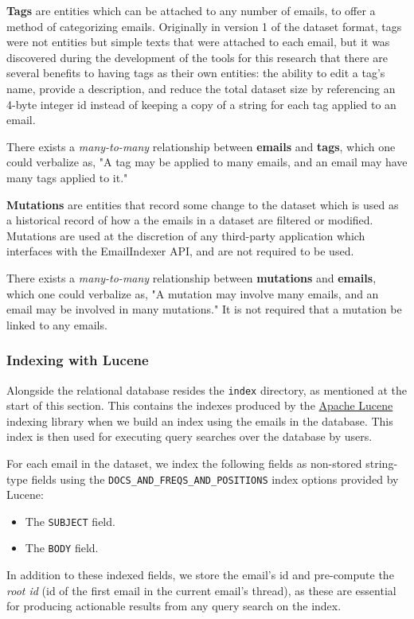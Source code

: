 \documentclass[a4paper, 12pt]{article}
\begin{document}
			\textbf{Tags} are entities which can be attached to any number of emails, to offer a method of categorizing emails. Originally in version 1 of the dataset format, tags were not entities but simple texts that were attached to each email, but it was discovered during the development of the tools for this research that there are several benefits to having tags as their own entities: the ability to edit a tag's name, provide a description, and reduce the total dataset size by referencing an 4-byte integer id instead of keeping a copy of a string for each tag applied to an email.
			
			There exists a \textit{many-to-many} relationship between \textbf{emails} and \textbf{tags}, which one could verbalize as, "A tag may be applied to many emails, and an email may have many tags applied to it."
			
			\textbf{Mutations} are entities that record some change to the dataset which is used as a historical record of how a the emails in a dataset are filtered or modified. Mutations are used at the discretion of any third-party application which interfaces with the EmailIndexer API, and are not required to be used.
			
			There exists a \textit{many-to-many} relationship between \textbf{mutations} and \textbf{emails}, which one could verbalize as, "A mutation may involve many emails, and an email may be involved in many mutations." It is not required that a mutation be linked to any emails.
		
		\subsubsection{Indexing with Lucene}
			Alongside the relational database resides the \texttt{index} directory, as mentioned at the start of this section. This contains the indexes produced by the \href{https://lucene.apache.org/}{Apache Lucene} indexing library when we build an index using the emails in the database. This index is then used for executing query searches over the database by users.
			
			For each email in the dataset, we index the following fields as non-stored string-type fields using the \texttt{DOCS\_AND\_FREQS\_AND\_POSITIONS} index options provided by Lucene\cite{apache-lucene}:
			\begin{itemize}
				\item The \texttt{SUBJECT} field.
				\item The \texttt{BODY} field.
			\end{itemize}
			In addition to these indexed fields, we store the email's id and pre-compute the \textit{root id} (id of the first email in the current email's thread), as these are essential for producing actionable results from any query search on the index.
	
\end{document}
